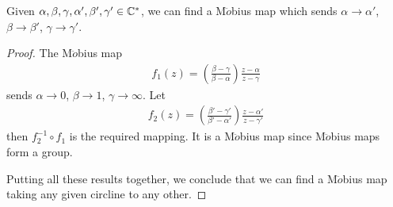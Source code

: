 \documentclass[a4paper]{article}
\begin{document}
Given $\alpha,\beta,\gamma,\alpha',\beta',\gamma' \in \mathbb{C}^*$, we can find a M$\ddot{o}$bius map which sends $\alpha \to \alpha'$, $\beta \to \beta'$, $\gamma \to \gamma'$.
\begin{proof}
The M$\ddot{o}$bius map
\begin{equation*}
\begin{aligned}
f_1(z) = \left(\frac{\beta - \gamma}{\beta - \alpha}\right) \frac{z-\alpha}{z-\gamma}
\end{aligned}
\end{equation*}
sends $\alpha \to 0$, $\beta \to 1$, $\gamma \to \infty$. Let
\begin{equation*}
\begin{aligned}
f_2(z) = \left(\frac{\beta' - \gamma'}{\beta' - \alpha'}\right) \frac{z-\alpha'}{z-\gamma'}
\end{aligned}
\end{equation*}
then $f^{-1}_2 \circ f_1$ is the required mapping. It is a M$\ddot{o}$bius map since M$\ddot{o}$bius maps form a group.

Putting all these results together, we conclude that we can find a M$\ddot{o}$bius map taking any given circline to any other.
\end{proof}
\end{document}
